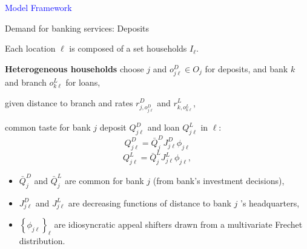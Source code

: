 \documentclass[notes,10pt, aspectratio=169]{beamer}
\newenvironment{wideitemize}{\itemize\addtolength{\itemsep}{10pt}}{\enditemize}
\begin{document}


\begin{frame}[noframenumbering]

\huge \centering \textcolor{blue}{Model Framework}

\end{frame}
    
\begin{frame}{Demand for banking services: Deposits}

    \begin{wideitemize}
        \item  Each location $\ell$ is composed of a set households $I_{\ell}$.
        \item \textbf{Heterogeneous households} choose  $j$ and  $o^D_{j \ell} \in O_j$ for deposits, and 
        bank $k$ and branch $o^L_{k \ell}$ for loans,
        
        \item given distance to branch and rates $r_{j, o_{j \ell}^D}^D$ and $r_{k, o_{k \ell}^L}^L$,


        \item  common taste for bank $j$ deposit $Q_{j \ell}^D$ and loan $Q_{j \ell}^L$  in $\ell$: 
\begin{equation}
Q_{j \ell}^D=\bar{Q}_j^D J_{j \ell}^D \phi_{j \ell}
\end{equation}
\begin{equation}
Q_{j \ell}^L=\bar{Q}_j^L J_{j \ell}^L \phi_{j \ell},
\end{equation}

        \begin{itemize}
            \item $\bar{Q}_j^D$ and $\bar{Q}_j^L$ are common for bank $j$ (from bank's investment decisions), 
            \item $J_{j \ell}^D$ and $J_{j \ell}^L$ are decreasing functions of distance to bank $j$ 's headquarters, 
            \item $\left\{\phi_{j \ell}\right\}_{\ell}$ are idiosyncratic appeal shifters drawn from a multivariate Frechet distribution.
        \end{itemize}


\end{wideitemize}
\end{frame}
\end{document}
